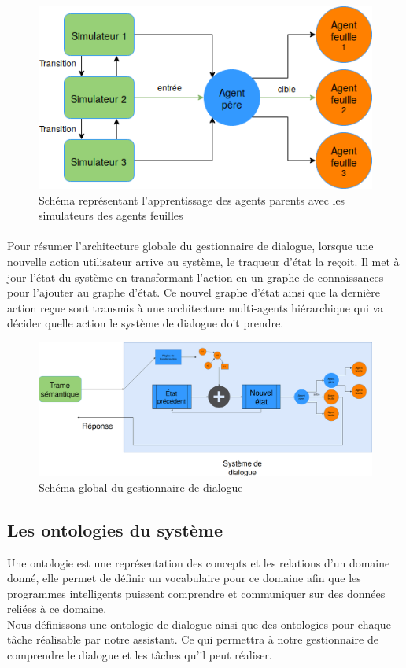 \begin{figure}[H] 
	
	\centering
	\includegraphics[width=0.7\linewidth]{images/Conception/DM/train_parent.png}
	\caption{Schéma représentant l'apprentissage des agents parents avec les simulateurs des agents feuilles}
\end{figure}\label{train_parent}
\paragraph{}
Pour résumer l’architecture globale du gestionnaire de dialogue, lorsque une nouvelle action utilisateur arrive au système, le traqueur d’état la reçoit. Il met à jour l’état du système en transformant l’action en un graphe de connaissances pour l’ajouter au graphe d’état. Ce nouvel graphe d’état ainsi que la dernière action reçue sont transmis à une architecture multi-agents hiérarchique qui va décider quelle action le système de dialogue doit prendre.
\begin{figure}[H] 
	
	\centering
	\includegraphics[width=0.88\linewidth]{images/Conception/DM/globalDM.png}
	\caption{Schéma global du gestionnaire de dialogue}
\end{figure}\label{globalDM}
	\subsection{Les ontologies du système}\label{onto}
		Une ontologie est une représentation des concepts et les relations d’un domaine donné, elle permet de définir un vocabulaire pour ce domaine afin que les programmes intelligents puissent comprendre  et communiquer sur des données reliées à ce domaine.\\
		Nous définissons une ontologie de dialogue ainsi que des ontologies pour chaque tâche réalisable par notre assistant. Ce qui permettra à notre gestionnaire de comprendre le dialogue et les tâches qu’il peut réaliser.
